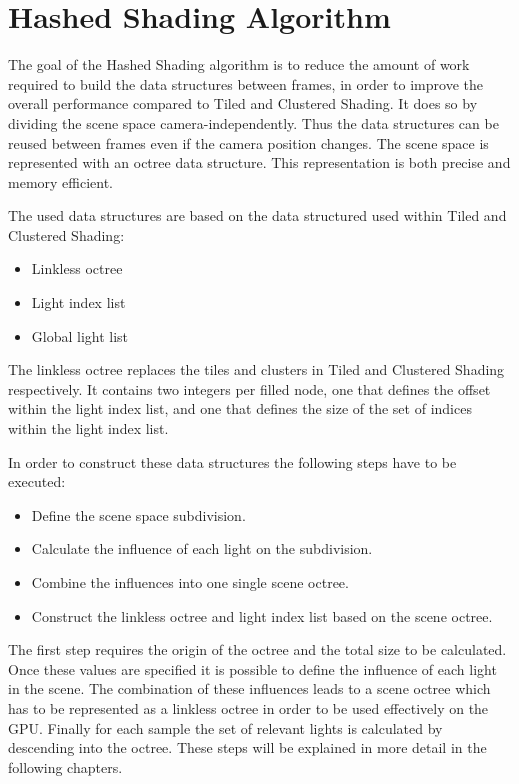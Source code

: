 \section{Hashed Shading Algorithm}



The goal of the Hashed Shading algorithm is to reduce the amount of work
required to build the data structures between frames, in order to improve the
overall performance compared to Tiled and Clustered Shading. It does so by
dividing the scene space camera-independently. Thus the data structures can be
reused between frames even if the camera position changes.
The scene space is represented with an octree data structure. This representation
is both precise and memory efficient.

The used data structures are based on the data structured used within Tiled and
Clustered Shading:

\begin{itemize}
  \item Linkless octree
  \item Light index list
  \item Global light list
\end{itemize}

\noindent The linkless octree replaces the tiles and clusters in Tiled and Clustered
Shading respectively. It contains two integers per filled node, one that defines the
offset within the light index list, and one that defines the size of the set of
indices within the light index list.

In order to construct these data structures the following steps have to be executed:

\begin{itemize}
  \item Define the scene space subdivision.
  \item Calculate the influence of each light on the subdivision.
  \item Combine the influences into one single scene octree.
  \item Construct the linkless octree and light index list based on the scene octree.
\end{itemize}

\noindent The first step requires the origin of the octree and the total size to be
calculated. Once these values are specified it is possible to define the influence
of each light in the scene. The combination of these influences leads to a scene
octree which has to be represented as a linkless octree in order to be used
effectively on the GPU. Finally for each sample the set of relevant lights is calculated
by descending into the octree. These steps will be explained in more detail in the
following chapters.

